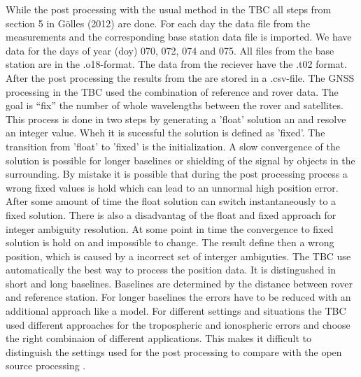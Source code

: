 While the post processing with the usual method in the TBC all steps from section 5 in Gölles (2012) are done.
For each day the data file from the measurements and the corresponding base station data file is imported. 
We have data for the days of year (doy) 070, 072, 074 and 075.
All files from the base station are in the .o18-format. 
The data from the reciever have the .t02 format. 
After the post processing the results from the are stored in a .csv-file.
The GNSS processing in the TBC used the combination of reference and rover data.
The goal is “fix” the number of whole wavelengths between the rover and satellites.
This process is done in two steps by generating a 'float' solution an and resolve an integer value. 
Wheh it is sucessful the solution is defined as 'fixed'.
The transition from 'float' to 'fixed' is the initialization.
A slow convergence of the solution is possible for longer baselines or shielding of the signal by objects in the surrounding.
By mistake it is possible that during the post processing process a wrong fixed values is hold which can lead to an unnormal high position error.
After some amount of time the float solution can switch instantaneously to a fixed solution. 
There is also a disadvantag of the float and fixed approach for integer ambiguity resolution.
At some point in time the convergence to fixed solution is hold on and impossible to change. 
The result define then a wrong position, which is caused by a incorrect set of interger ambiguties.
The TBC use automatically the best way to process the position data. 
It is distingushed in short and long baselines.
Baselines are determined by the distance between rover and reference station.
For longer baselines the errors have to be reduced with an additional approach like a model.
For different settings and situations the TBC used different approaches for the tropospheric and ionospheric errors and choose the right combinaion of different applications.
This makes it difficult to distinguish the settings used for the post processing to compare with the open source processing \citep{Trprocess}.
\medskip

